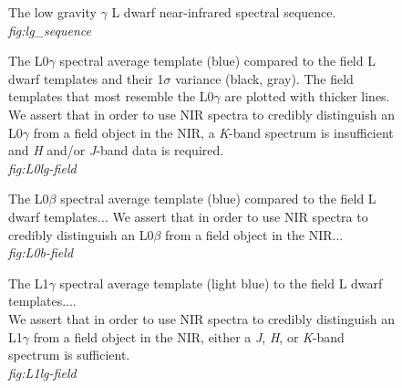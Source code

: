 \documentclass[12pt,preprint]{aastex}
\begin{document}
\begin{figure}
	\caption{The low gravity $\gamma$ L dwarf near-infrared spectral sequence. \\
	\emph{fig:lg\_sequence}}
	\label{fig:lg_sequence}
\end{figure}
	


\begin{figure}
	\caption{The L0$\gamma$ spectral average template (blue) compared to the field L dwarf templates and their 1$\sigma$ variance (black, gray). The field templates that most resemble the L0$\gamma$ are plotted with thicker lines. We assert that in order to use NIR spectra to credibly distinguish an L0$\gamma$ from a field object in the NIR, a \emph{K}-band spectrum is insufficient and \emph{H} and/or \emph{J}-band data is required.\\
	\emph{fig:L0lg-field}}
	\label{fig:L0lg-field}
\end{figure}

\begin{figure}
	\caption{The L0$\beta$ spectral average template (blue) compared to the field L dwarf templates... We assert that in order to use NIR spectra to credibly distinguish an L0$\beta$ from a field object in the NIR...\\
	\emph{fig:L0b-field}}
	\label{fig:L0b-field}
\end{figure}

\begin{figure}
	\caption{The L1$\gamma$ spectral average template (light blue) to the field L dwarf templates.... \\
	We assert that in order to use NIR spectra to credibly distinguish an L1$\gamma$ from a field object in the NIR, either a \emph{J}, \emph{H}, or \emph{K}-band spectrum is sufficient. \\
	\emph{fig:L1lg-field}}
	\label{fig:L1lg-field}
\end{figure}
\end{document}
